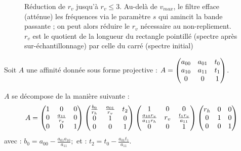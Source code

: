 		\begin{figure}
		\centering
		\caption{Réduction de $r_v$ jusqu'à $r_v \leq 3$. Au-delà de $v_{max}$, le filtre efface (atténue) les fréquences via le paramètre $s$ qui amincit la bande passante ; on peut alors réduire le $r_v$ nécessaire au non-repliement. $r_v$ est le quotient de la longueur du rectangle pointillé (spectre après sur-échantillonnage) par celle du carré (spectre initial)}
		\label{rvleq3}
		\end{figure}


		\begin{prop}
		\label{propositionDecompositionAffinite}
		Soit $A$ une affinité donnée sous forme projective : $A = \begin{pmatrix} a_{00} & a_{01} & t_0\\ a_{10} & a_{11} & t_1\\ 0&0&1 \end{pmatrix}$.
		
		$A$ se décompose de la manière suivante :
		\[
			A = 
			\begin{pmatrix} 1 & 0 & 0\\ 0 & \frac{a_{11}}{r_v} & 0\\ 0 & 0 & 1 \end{pmatrix}
			\begin{pmatrix} \frac{b_{0}}{r_h} & \frac{a_{01}}{r_v} & t_2\\ 0 & 1 & 0\\ 0 & 0 & 1 \end{pmatrix}
			\begin{pmatrix} 1 & 0 & 0\\ \frac{a_{10}r_v}{a_{11}r_h} & r_v & \frac{t_1r_v}{a_{11}}\\ 0 & 0 & 1 \end{pmatrix}
			\begin{pmatrix} r_h & 0 & 0\\ 0 & 1 & 0\\ 0 & 0 & 1 \end{pmatrix}
		\]
avec : $b_0 = a_{00} - \frac{a_{01}a_{10}}{a_{11}};$ et : $t_2 = t_0 - \frac{a_{01}t_1}{a_{11}}$.
\end{prop}
